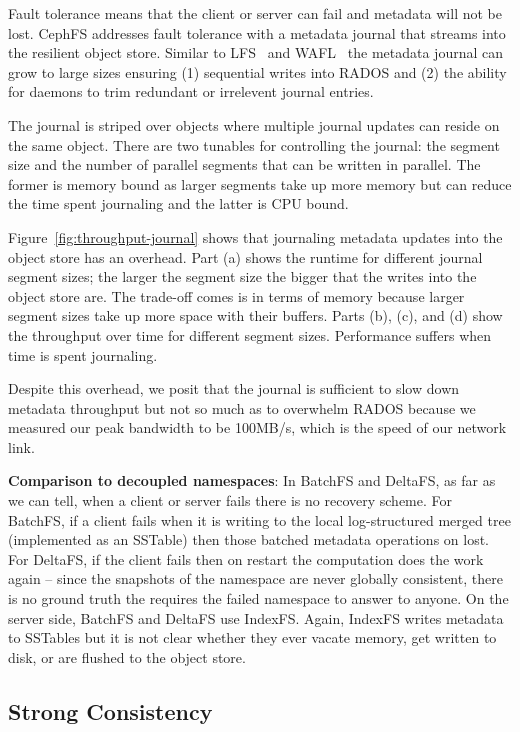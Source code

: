 Fault tolerance means that the client or server can fail and metadata will not
be lost.  CephFS addresses fault tolerance with a metadata journal that streams
into the resilient object store. Similar to LFS~\cite{} and WAFL~\cite{} the
metadata journal can grow to large sizes ensuring (1) sequential writes into
RADOS and (2) the ability for daemons to trim redundant or irrelevent journal
entries. 

The journal is striped over objects where multiple journal updates can reside
on the same object. There are two tunables for controlling the journal: the
segment size and the number of parallel segments that can be written in
parallel. The former is memory bound as larger segments take up more memory but
can reduce the time spent journaling and the latter is CPU bound. 

Figure~\ref{fig:throughput-journal} shows that journaling metadata updates into
the object store has an overhead. Part (a) shows the runtime for different
journal segment sizes; the larger the segment size the bigger that the writes
into the object store are. The trade-off comes is in terms of memory because
larger segment sizes take up more space with their buffers. Parts (b), (c), and
(d) show the throughput over time for different segment sizes. Performance
suffers when time is spent journaling. 

Despite this overhead, we posit that the journal is sufficient to slow down
metadata throughput but not so much as to overwhelm RADOS because we measured
our peak bandwidth to be 100MB/s, which is the speed of our network link.

\textbf{Comparison to decoupled namespaces}: In BatchFS and DeltaFS, as far as
we can tell, when a client or server fails there is no recovery scheme. For
BatchFS, if a client fails when it is writing to the local log-structured
merged tree (implemented as an SSTable) then those batched metadata operations
on lost. For DeltaFS, if the client fails then on restart the computation does
the work again -- since the snapshots of the namespace are never globally
consistent, there is no ground truth the requires the failed namespace to
answer to anyone. On the server side, BatchFS and DeltaFS use IndexFS. Again,
IndexFS writes metadata to SSTables but it is not clear whether they ever
vacate memory, get written to disk, or are flushed to the object store.

\subsection{Strong Consistency} 

